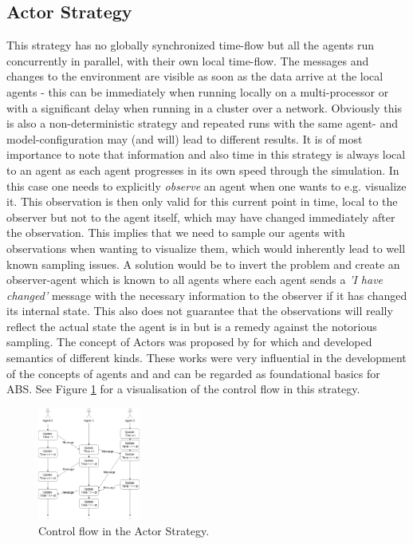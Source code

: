 \subsection{Actor Strategy}
This strategy has no globally synchronized time-flow but all the agents run concurrently in parallel, with their own local time-flow. The messages and changes to the environment are visible as soon as the data arrive at the local agents - this can be immediately when running locally on a multi-processor or with a significant delay when running in a cluster over a network. Obviously this is also a non-deterministic strategy and repeated runs with the same agent- and model-configuration may (and will) lead to different results. It is of most importance to note that information and also time in this strategy is always local to an agent as each agent progresses in its own speed through the simulation. In this case one needs to explicitly \textit{observe} an agent when one wants to e.g. visualize it. This observation is then only valid for this current point in time, local to the observer but not to the agent itself, which may have changed immediately after the observation. This implies that we need to sample our agents with observations when wanting to visualize them, which would inherently lead to well known sampling issues. A solution would be to invert the problem and create an observer-agent which is known to all agents where each agent sends a \textit{'I have changed'} message with the necessary information to the observer if it has changed its internal state. This also does not guarantee that the observations will really reflect the actual state the agent is in but is a remedy against the notorious sampling. The concept of Actors was proposed by \cite{hewitt_universal_1973} for which \cite{grief_semantics_1975} and \cite{clinger_foundations_1981} developed semantics of different kinds. These works were very influential in the development of the concepts of agents and and can be regarded as foundational basics for ABS.  See Figure \ref{fig:strategy_act} for a visualisation of the control flow in this strategy.

\begin{figure}[H]
	\centering
	\includegraphics[width=0.3\textwidth, angle=0]{./fig/fpabs/timedriven/actor.png}
	\caption{Control flow in the Actor Strategy.}
	\label{fig:strategy_act}
\end{figure}
